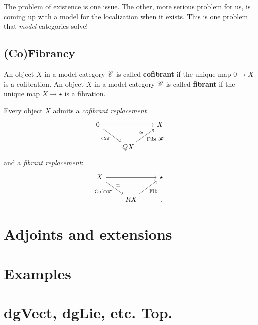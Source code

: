\documentclass[11pt]{amsart}
\begin{document}
The problem of existence is one issue. 
The other, more serious problem for us, is coming up with a model for the localization when it exists. 
This is one problem that {\em model} categories solve!

\subsection{(Co)Fibrancy}

\begin{dfn}
An object $X$ in a model category $\mathscr C$ is called {\bf cofibrant} if the unique map $0 \to X$ is a cofibration. 
An object $X$ in a model category $\mathscr C$ is called {\bf fibrant} if the unique map $X \to \star$ is a fibration. 
\end{dfn}

Every object $X$ admits a {\em cofibrant replacement}
\[
\begin{tikzcd}
0 \ar[rr] \ar[dr, "{\rm Cof}"'] & & X \\
& Q X \ar[ur, "\simeq", "{\rm Fib} \cap \sW"'] & 
\end{tikzcd}
\] 
and a {\em fibrant replacement}:
\[
\begin{tikzcd}
X \ar[rr] \ar[dr, "\simeq", "{\rm Cof} \cap \sW"'] & & \star \\
& R X \ar[ur, "{\rm Fib}"'] & .
\end{tikzcd}
\] 


\section{Adjoints and extensions}


\section{Examples}



\section{dgVect, dgLie, etc. Top.}
\end{document}
